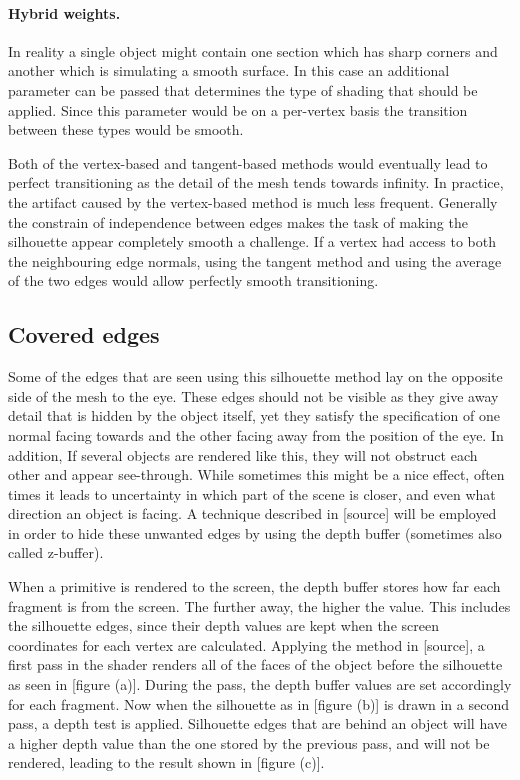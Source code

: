 \documentclass[a4paper, 12pt]{article}
\begin{document}
\paragraph{Hybrid weights.}
In reality a single object might contain one section which has sharp corners and another which is simulating a smooth surface. In this case an additional parameter can be passed that determines the type of shading that should be applied. Since this parameter would be on a per-vertex basis the transition between these types would be smooth.

Both of the vertex-based and tangent-based methods would eventually lead to perfect transitioning as the detail of the mesh tends towards infinity. In practice, the artifact caused by the vertex-based method is much less frequent. Generally the constrain of independence between edges makes the task of making the silhouette appear completely smooth a challenge. If a vertex had access to both the neighbouring edge normals, using the tangent method and using the average of the two edges would allow perfectly smooth transitioning.


\subsection{Covered edges}
Some of the edges that are seen using this silhouette method lay on the opposite side of the mesh to the eye. These edges should not be visible as they give away detail that is hidden by the object itself, yet they satisfy the specification of one normal facing towards and the other facing away from the position of the eye. In addition, If several objects are rendered like this, they will not obstruct each other and appear see-through. While sometimes this might be a nice effect, often times it leads to uncertainty in which part of the scene is closer, and even what direction an object is facing. A technique described in [source] will be employed in order to hide these unwanted edges by using the depth buffer (sometimes also called z-buffer).

When a primitive is rendered to the screen, the depth buffer stores how far each fragment is from the screen. The further away, the higher the value. This includes the silhouette edges, since their depth values are kept when the screen coordinates for each vertex are calculated. Applying the method in [source], a first pass in the shader renders all of the faces of the object before the silhouette as seen in [figure (a)]. During the pass, the depth buffer values are set accordingly for each fragment. Now when the silhouette as in [figure (b)] is drawn in a second pass, a depth test is applied. Silhouette edges that are behind an object will have a higher depth value than the one stored by the previous pass, and will not be rendered, leading to the result shown in [figure (c)].
\end{document}

